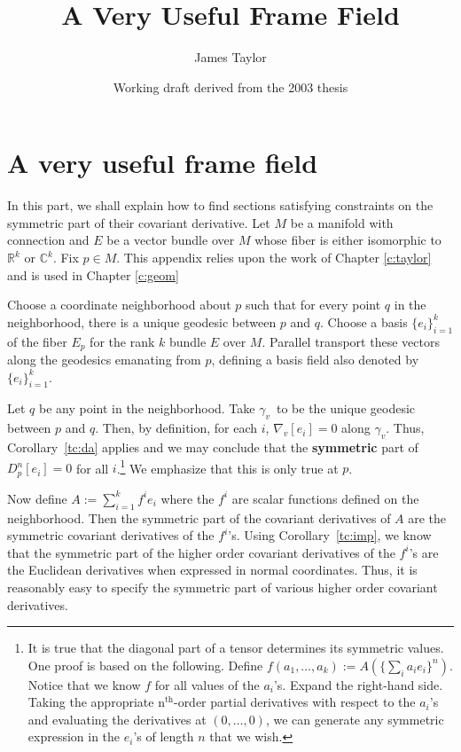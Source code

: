 \documentclass[11pt]{article}
\title{A Very Useful Frame Field}
\author{James Taylor}
\date{Working draft derived from the 2003 thesis}
\theoremstyle{remark}
\begin{document}
\maketitle

\section{A very useful frame field} \label{a:difgeom} 


In this part, we shall explain how to find sections satisfying
constraints on the symmetric part of their covariant derivative. 
Let $M$ be a manifold with connection and $E$ be a vector bundle over $M$
whose fiber is either isomorphic to \ensuremath{\mathbb{R}^{k}} or $\ensuremath{\mathbb{C}}^k$. Fix $p
\in M$. This appendix relies upon the work of Chapter \ref{c:taylor}
and is used in Chapter \ref{c:geom}


Choose a coordinate neighborhood about $p$ such that for every point
$q$ in the neighborhood, there is a unique
geodesic between $p$ and $q$. Choose a basis $\{e_i\}_{i=1}^{k}$
of the fiber $E_p$ for the rank $k$ bundle $E$  
over $M$. Parallel transport these vectors along the geodesics
emanating from $p$, defining a basis field  also denoted by 
$\{e_i\}_{i=1}^{k}$. 

Let $q$ be any point in the neighborhood. Take
\ensuremath{\gamma_v}\ to be the unique geodesic between $p$ and $q$. Then, by
definition, for each $i$, $\nabla_v [e_i] = 0$ along $\ensuremath{\gamma_v}$. Thus,
Corollary~{\ref{tc:da}} applies and we may conclude that the {\bf symmetric}
 part of  $D^n_p [e_i]
=0$ for all $i$.\footnote{It is true that the diagonal part of a
  tensor determines its symmetric values. One proof is based on the
  following. Define $f(a_1, \ldots,a_k) \ensuremath{:=} A(\{\sum_i a_i e_i \}^n)$.
Notice that we know $f$ for all values of the $a_i$'s. Expand the
right-hand side. Taking the appropriate \ensuremath{\text{n}^{\text{th}}}-order partial derivatives
with respect to the 
$a_i$'s and evaluating the derivatives at $(0,\ldots, 0)$, we can
generate any symmetric expression in the $e_i$'s of length $n$ that we
wish.} 
 We emphasize that this is only true at $p$.

Now define $A := \sum_{i=1}^k f^i e_i$ where the $f^i$ are
scalar functions defined on the neighborhood. Then the symmetric part
of the covariant
derivatives of $A$ are the symmetric covariant derivatives of the $f^i$'s. 
Using Corollary~{\ref{tc:imp}}, we know that the symmetric part of the
higher order covariant derivatives of the $f^i$'s are  the
Euclidean derivatives when expressed in 
 normal coordinates. Thus, it is reasonably
easy to specify the symmetric part of various higher order covariant
derivatives. 
\end{document}
